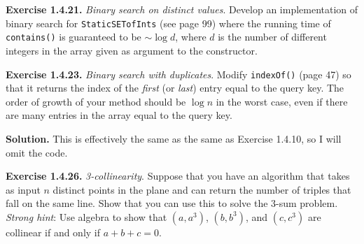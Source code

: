 \documentclass[12pt, a4paper]{article}
\newenvironment{ex}[2][Exercise]
{\par\medskip\noindent \textbf{#1 #2.}}
{\medskip}
\newenvironment{sol}[1][Solution]
{\par\medskip\noindent \textbf{#1.} }
{\medskip}
\begin{document}
	\begin{ex}{1.4.21}
		\emph{Binary search on distinct values}. Develop an implementation of binary search
		for \texttt{StaticSETofInts} (see page 99) where the running time of \texttt{contains()}
		is guaranteed to be $\sim \log d$, where $d$ is the number of different integers in the
		array given as argument to the constructor.
	\end{ex}
	\begin{ex}{1.4.23}
		\emph{Binary search with duplicates}. Modify \texttt{indexOf()} (page 47) so that it
		returns the index of the \emph{first} (or \emph{last}) entry equal to the query key.
		The order of growth of your method should be $\log n$ in the worst case, even if there
		are many entries in the array equal to the query key.
	\end{ex}
	\begin{sol}
		This is effectively the same as the same as Exercise 1.4.10, so I will omit the code.
	\end{sol}
	\begin{ex}{1.4.26}
		\emph{3-collinearity}. Suppose that you have an algorithm that takes as input $n$
		distinct points in the plane and can return the number of triples that fall on
		the same line. Show that you can use this to solve the 3-sum problem.
		\emph{Strong hint}: Use algebra to show that $(a,a^3)$, $(b,b^3)$, and $(c,c^3)$
		are collinear if and only if $a+b+c=0$.
	\end{ex}
\end{document}
